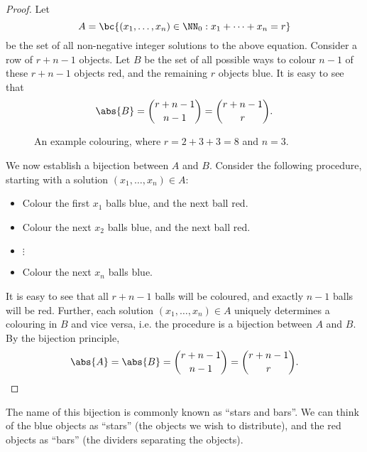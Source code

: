 \begin{proof}
    Let \[A = \bc{(x_1, \dots, x_n) \in \NN_0 : x_1 + \dots + x_n = r}\] be the set of all non-negative integer solutions to the above equation. Consider a row of $r + n - 1$ objects. Let $B$ be the set of all possible ways to colour $n-1$ of these $r + n - 1$ objects red, and the remaining $r$ objects blue. It is easy to see that \[\abs{B} = \binom{r + n - 1}{n-1} = \binom{r + n - 1}{r}.\]

    \begin{figure}[H]
        \centering
        \caption{An example colouring, where $r = 2 + 3 + 3 = 8$ and $n = 3$.}
    \end{figure}
    
    We now establish a bijection between $A$ and $B$. Consider the following procedure, starting with a solution $(x_1, \dots, x_n) \in A$:
    \begin{itemize}
        \item Colour the first $x_1$ balls blue, and the next ball red.
        \item Colour the next $x_2$ balls blue, and the next ball red.
        \item[] $\vdots$
        \item Colour the next $x_n$ balls blue.
    \end{itemize}
    It is easy to see that all $r + n - 1$ balls will be coloured, and exactly $n-1$ balls will be red. Further, each solution $(x_1, \dots, x_n) \in A$ uniquely determines a colouring in $B$ and vice versa, i.e. the procedure is a bijection between $A$ and $B$. By the bijection principle, \[\abs{A} = \abs{B} = \binom{r + n - 1}{n - 1} = \binom{r + n - 1}{r}.\]
\end{proof}

The name of this bijection is commonly known as ``stars and bars''. We can think of the blue objects as ``stars'' (the objects we wish to distribute), and the red objects as ``bars'' (the dividers separating the objects).


